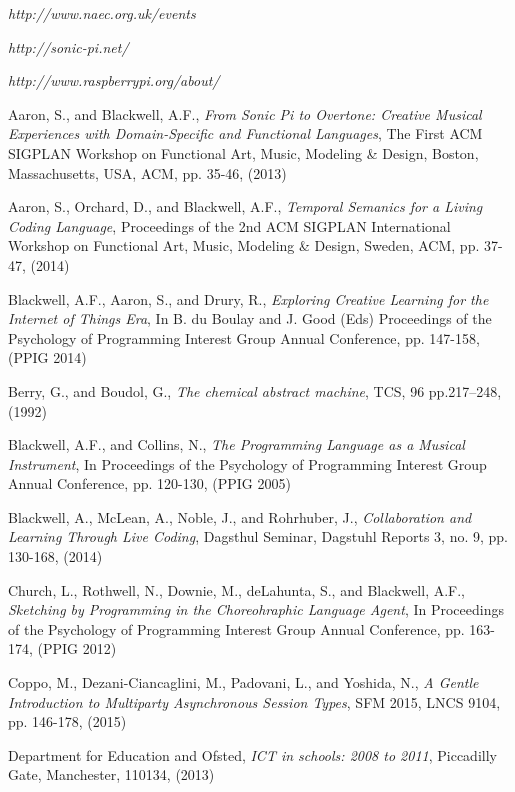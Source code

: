 \documentclass[11pt]{scrartcl}
\begin{document}
\begin{thebibliography}{9}

  \emph{http://www.naec.org.uk/events}

  \emph{http://sonic-pi.net/}

  \emph{http://www.raspberrypi.org/about/}

  Aaron, S., and Blackwell, A.F.,
  \emph{From Sonic Pi to Overtone: Creative Musical Experiences with Domain-Specific and Functional Languages},
  The First ACM SIGPLAN Workshop on Functional Art, Music, Modeling \& Design,
  Boston, Massachusetts, USA,
  ACM, pp. 35-46,
  (2013)

  Aaron, S., Orchard, D., and Blackwell, A.F.,
  \emph{Temporal Semanics for a Living Coding Language},
  Proceedings of the 2nd ACM SIGPLAN International Workshop on Functional Art, Music, Modeling \& Design,
  Sweden, ACM, pp. 37-47,
  (2014)

  Blackwell, A.F., Aaron, S., and Drury, R., 
  \emph{Exploring Creative Learning for the Internet of Things Era},
  In B. du Boulay and J. Good (Eds) Proceedings of the Psychology of Programming Interest Group Annual Conference, 
  pp. 147-158,
  (PPIG 2014)

  Berry, G., and Boudol, G.,
  \emph{The chemical abstract machine},
  TCS, 96 pp.217–248, 
  (1992)

  Blackwell, A.F., and Collins, N.,
  \emph{The Programming Language as a Musical Instrument},
  In Proceedings of the Psychology of Programming Interest Group Annual Conference,
  pp. 120-130,
  (PPIG 2005)

  Blackwell, A., McLean, A., Noble, J., and Rohrhuber, J.,
  \emph{Collaboration and Learning Through Live Coding},
  Dagsthul Seminar, Dagstuhl Reports 3,
  no. 9, pp. 130-168,
  (2014)

  Church, L., Rothwell, N., Downie, M., deLahunta, S., and Blackwell, A.F.,
  \emph{Sketching by Programming in the Choreohraphic Language Agent},
  In Proceedings of the Psychology of Programming Interest Group Annual Conference,
  pp. 163-174,
  (PPIG 2012)

  Coppo, M., Dezani-Ciancaglini, M., Padovani, L., and Yoshida, N.,
  \emph{A Gentle Introduction to Multiparty Asynchronous Session Types},
  SFM 2015, LNCS 9104, pp. 146-178,
  (2015)

  Department for Education and Ofsted,
  \emph{ICT in schools: 2008 to 2011},
  Piccadilly Gate,
  Manchester,
  110134,
  (2013)


\end{thebibliography}
\end{document}
